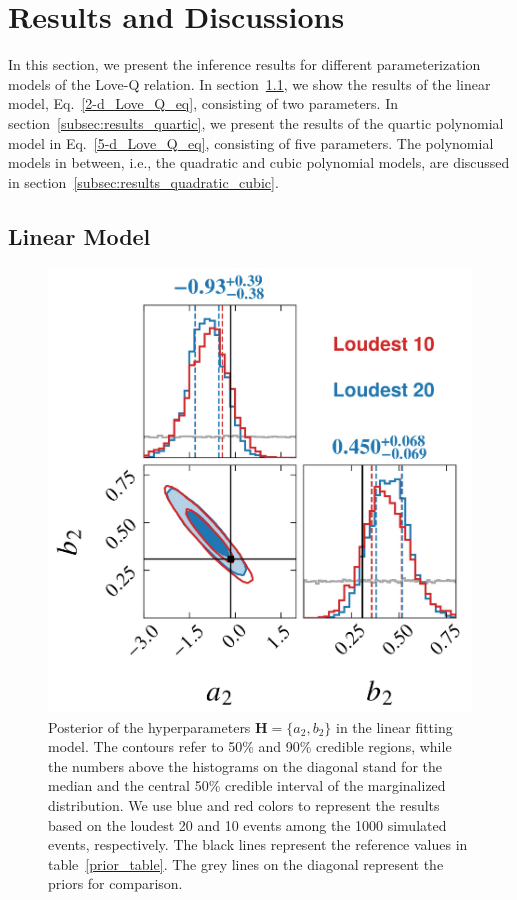 \documentclass[a4paper,11pt]{article}
\newcommand{\ZW}[1]{\textcolor{magenta}{$\mathcal{ZW}$:~#1}}
\begin{document}
\section{Results and Discussions}
\label{sec:results}
In this section, we present the inference results for different parameterization 
models of the Love-Q relation. In section~\ref{subsec:results_linear_model}, we 
show the results of the linear model, Eq.~\eqref{2-d_Love_Q_eq}, consisting of two parameters.
In section~\ref{subsec:results_quartic}, we present the results of the quartic 
polynomial model in Eq.~\eqref{5-d_Love_Q_eq}, consisting of five parameters. The 
polynomial models in between, i.e., the quadratic and cubic polynomial models, are 
discussed in section~\ref{subsec:results_quadratic_cubic}.
\subsection{Linear Model}
\label{subsec:results_linear_model}
\begin{figure}[t]
    \centering
    \includegraphics[width=0.5\linewidth]{fig_comparison_corner_plot.pdf}
    \caption{Posterior of the hyperparameters ${\bm H} = \{a_2,b_2\}$
     in the linear fitting model. The contours refer to 50\% and 90\% credible
     regions, while the numbers above the histograms on the diagonal stand 
    for the median and the central 50\% credible interval of the marginalized
     distribution. We use blue and red colors to represent the results based on
     the loudest 20 and 10 events among the 1000
    simulated events, respectively.
     The black lines represent the reference values in table~\ref{prior_table}.
     The grey lines on the diagonal represent the priors for comparison.}
    \label{corner2-d}
\end{figure}
\end{document}
